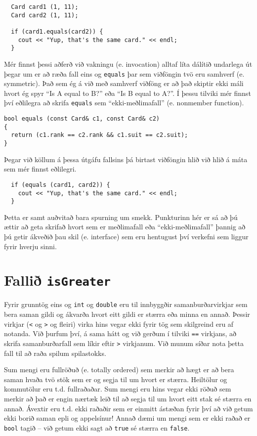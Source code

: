 \begin{verbatim}
  Card card1 (1, 11);
  Card card2 (1, 11);

  if (card1.equals(card2)) {
    cout << "Yup, that's the same card." << endl;
  }
\end{verbatim}
%
Mér finnst þessi aðferð við vakningu (e. invocation) alltaf líta dálítið undarlega út
þegar um er að ræða fall eins og {\tt equals} þar sem viðföngin tvö eru samhverf (e. symmetric).
Það sem ég á við með samhverf viðföng er að það skiptir ekki máli hvort ég spyr 
``Is A equal to B?'' eða ``Is B equal to A?''.
Í þessu tilviki mér finnst því eðlilegra að skrifa {\tt equals} sem ``ekki-meðlimafall'' (e. nonmember function). 

\begin{verbatim}
bool equals (const Card& c1, const Card& c2)
{
  return (c1.rank == c2.rank && c1.suit == c2.suit);
}
\end{verbatim}
%
Þegar við köllum á þessa útgáfu fallsins þá birtast viðföngin hlið við hlið á máta sem mér finnst eðlilegri.

\begin{verbatim}
  if (equals (card1, card2)) {
    cout << "Yup, that's the same card." << endl;
  }
\end{verbatim}
%
Þetta er samt auðvitað bara spurning um smekk.
Punkturinn hér er sá að þú ættir að geta skrifað hvort sem er meðlimafall eða ``ekki-meðlimafall'' þannig að þú getir ákveðið þau skil (e. interface)
sem eru hentugust því verkefni sem liggur fyrir hverju sinni.

\section{Fallið {\tt isGreater}}

Fyrir grunntög eins og {\tt int} og {\tt double} eru til innbyggðir samanburðarvirkjar
sem bera saman gildi og ákvarða hvort eitt gildi er stærra eða minna en annað.
Þessir virkjar ({\tt <} og {\tt >} og fleiri) virka hins vegar ekki fyrir tög sem skilgreind eru af notanda.
Við þurfum því, á sama hátt og við gerðum í tilviki {\tt ==} virkjans, að skrifa samanburðarfall sem líkir eftir {\tt >} virkjanum.
Við munum síðar nota þetta fall til að raða spilum spilastokks.


Sum mengi eru fullröðuð (e. totally ordered) sem merkir að hægt er að bera saman hvaða tvö stök sem er og segja til um hvort er stærra.
Heiltölur og kommutölur eru t.d. fullraðaðar.
Sum mengi eru hins vegar ekki röðuð sem merkir að það er engin nærtæk leið til að segja til um hvort eitt stak sé stærra en annað.
Ávextir eru t.d. ekki raðaðir sem er einmitt ástæðan fyrir því að við getum ekki borið saman epli og appelsínur!
Annað dæmi um mengi sem er ekki raðað er {\tt bool} tagið -- við getum ekki sagt að {\tt true} sé stærra en {\tt false}.

